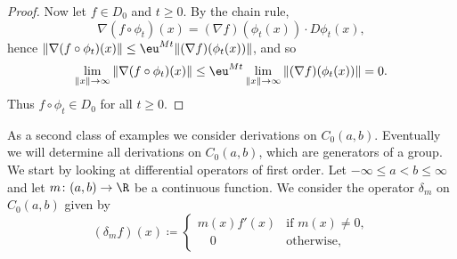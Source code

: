 \begin{proof}
Now let $f \in D_{0}$ and $t \geq 0$. By the chain rule,
\[
    \nabla(f \circ \phi_{t})(x) = (\nabla f)(\phi_{t}(x)) \cdot D\phi_{t}(x),
\]
hence $\|\nabla(f \circ \phi_{t})(x)\| \leq \eu^{Mt}\|(\nabla f)(\phi_{t}(x))\|$, and so
\[
    \lim_{\|x\| \to \infty} \|\nabla(f \circ \phi_{t})(x)\|
    \leq \eu^{Mt} \lim_{\|x\| \to \infty} \|(\nabla f)(\phi_{t}(x))\| = 0.
\]
Thus $f \circ \phi_{t} \in D_{0}$ for all $t \geq 0$.
\end{proof}
As a second class of examples we consider derivations on $C_{0}(a,b)$.
Eventually we will determine all derivations on $C_{0}(a,b)$, which are generators of a group.
We start by looking at differential operators of first order.
Let $-\infty \leq a < b \leq \infty$ and let $m \colon (a,b) \to \R$ be a continuous function.
We consider the operator $\delta_{m}$ on $C_{0}(a,b)$ given by
\begin{equation*}\label{eq:b2-delta-m}
(\delta_{m}f)(x) \coloneq \begin{cases}
    m(x)f'(x) & \text{if } m(x) \neq 0 , \\
    \quad 0 & \text{otherwise} ,
\end{cases}
\end{equation*}
